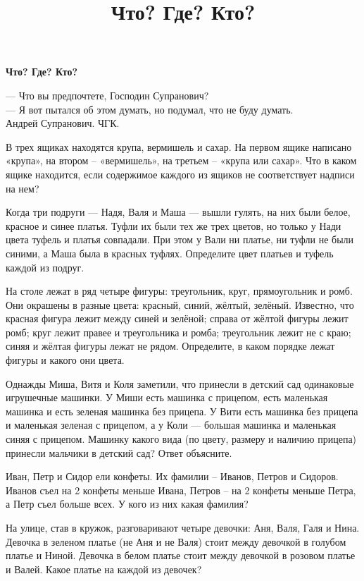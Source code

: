 \centerline{\bf \Huge  Что? Где? Кто?}
\title{Что? Где? Кто?}

\begin{flushright}
    \scriptsize — Что вы предпочтете, Господин Супранович?\\
— Я вот пытался об этом думать, но подумал, что не буду думать.\\
Андрей Супранович. ЧГК.

\end{flushright}

 В трех ящиках находятся крупа, вермишель и сахар. На первом ящике написано «крупа», на втором – «вермишель», на третьем – «крупа или сахар». Что в каком ящике находится, если содержимое каждого из ящиков не соответствует надписи на нем?

Когда три подруги — Надя, Валя и Маша — вышли гулять, на них были белое, красное и синее платья. Туфли их были тех же трех цветов, но только у Нади цвета туфель и платья совпадали. При этом у Вали ни платье, ни туфли не были синими, а Маша была в красных туфлях. Определите цвет платьев и туфель каждой из подруг.

На столе лежат в ряд четыре фигуры: треугольник, круг, прямоугольник и ромб. Они окрашены в разные цвета: красный, синий, жёлтый, зелёный. Известно, что красная фигура лежит между синей и зелёной; справа от жёлтой фигуры лежит ромб; круг лежит правее и треугольника и ромба; треугольник лежит не с краю; синяя и жёлтая фигуры лежат не рядом. Определите, в каком порядке лежат фигуры и какого они цвета.

 Однажды Миша, Витя и Коля заметили, что принесли в детский сад одинаковые игрушечные машинки. У Миши есть машинка с прицепом, есть маленькая машинка и есть зеленая машинка без прицепа. У Вити есть машинка без прицепа и маленькая зеленая с прицепом, а у Коли — большая машинка и маленькая синяя с прицепом. Машинку какого вида (по цвету, размеру и наличию прицепа) принесли мальчики в детский сад? Ответ объясните.

Иван, Петр и Сидор ели конфеты. Их фамилии – Иванов, Петров и Сидоров. Иванов съел на 2 конфеты меньше Ивана, Петров – на 2 конфеты меньше Петра, а Петр съел больше всех. У кого из них какая фамилия?

На улице, став в кружок, разговаривают четыре девочки: Аня, Валя, Галя и Нина. Девочка в зеленом платье (не Аня и не Валя) стоит между девочкой в голубом платье и Ниной. Девочка в белом платье стоит между девочкой в розовом платье и Валей. Какое платье на каждой из девочек?

